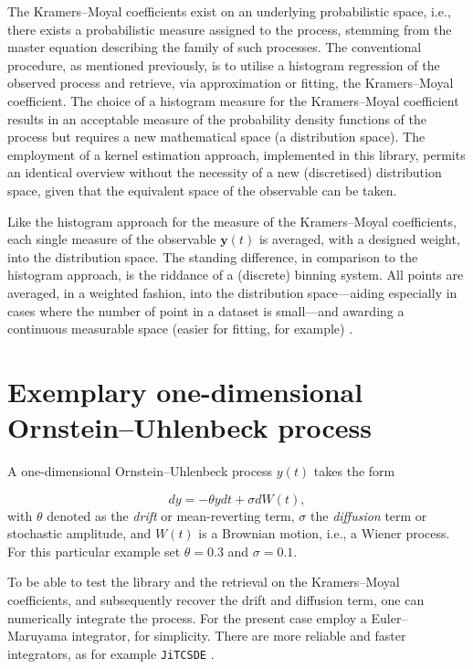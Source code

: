 \documentclass[showpacs,showkeys,10pt,onecolumn,superscriptaddress,notitlepage]{revtex4-1}
\begin{document}
The Kramers--Moyal coefficients exist on an underlying probabilistic space, i.e., there exists a probabilistic measure assigned to the process, stemming from the master equation describing the family of such processes.
The conventional procedure, as mentioned previously, is to utilise a histogram regression of the observed process and retrieve, via approximation or fitting, the Kramers--Moyal coefficient.
The choice of a histogram measure for the Kramers--Moyal coefficient results in an acceptable measure of the probability density functions of the process but requires a new mathematical space (a distribution space).
The employment of a kernel estimation approach, implemented in this library, permits an identical overview without the necessity of a new (discretised) distribution space, given that the equivalent space of the observable can be taken.

Like the histogram approach for the measure of the Kramers--Moyal coefficients, each single measure of the observable $\boldsymbol{y}(t)$ is averaged, with a designed weight, into the distribution space.
The standing difference, in comparison to the histogram approach, is the riddance of a (discrete) binning system.
All points are averaged, in a weighted fashion, into the distribution space---aiding especially in cases where the number of point in a dataset is small---and awarding a continuous measurable space (easier for fitting, for example) \cite{Lamouroux}.


\section{Exemplary one-dimensional Ornstein--Uhlenbeck process}
A one-dimensional Ornstein--Uhlenbeck process $y(t)$ takes the form

\begin{equation}\label{eq:OU}
    d y = - \theta y dt + \sigma d W(t),
\end{equation}
with $\theta$ denoted as the \textit{drift} or mean-reverting term, $\sigma$ the \textit{diffusion} term or stochastic amplitude, and $W(t)$ is a Brownian motion, i.e., a Wiener process.
For this particular example set $\theta = 0.3$ and $\sigma=0.1$.

To be able to test the library and the retrieval on the Kramers--Moyal coefficients, and subsequently recover the drift and diffusion term, one can numerically integrate the process.
For the present case employ a Euler--Maruyama integrator, for simplicity.
There are more reliable and faster integrators, as for example \texttt{JiTCSDE} \cite{Ansmann}.
\end{document}
